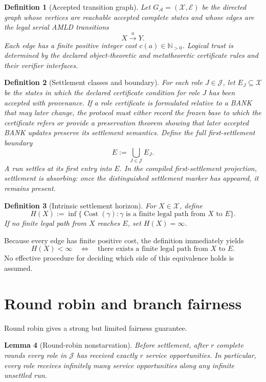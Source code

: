 \documentclass[11pt]{article}
\newtheorem{definition}{Definition}[section]
\newtheorem{lemma}[definition]{Lemma}
\theoremstyle{remark}
\newcommand{\N}{\mathbb N}
\newcommand{\Cost}{\operatorname{Cost}}
\begin{document}
\begin{definition}[Accepted transition graph]
Let $G_{\mathcal A}=(\mathcal X,\mathcal E)$ be the directed graph whose vertices are reachable accepted complete states and whose edges are the legal serial AMLD transitions
\[
X\xrightarrow{a}Y.
\]
Each edge has a finite positive integer cost $c(a)\in\N_{>0}$.  Logical trust is determined by the declared object-theoretic and metatheoretic certificate rules and their verifier interfaces.
\end{definition}

\begin{definition}[Settlement classes and boundary]
For each role $J\in\mathcal J$, let $E_J\subseteq\mathcal X$ be the states in which the declared certificate condition for role $J$ has been accepted with provenance.  If a role certificate is formulated relative to a BANK that may later change, the protocol must either record the frozen base to which the certificate refers or provide a preservation theorem showing that later accepted BANK updates preserve its settlement semantics.  Define the full first-settlement boundary
\[
E:=\bigcup_{J\in\mathcal J}E_J.
\]
A run settles at its first entry into $E$.  In the compiled first-settlement projection, settlement is absorbing: once the distinguished settlement marker has appeared, it remains present.
\end{definition}

\begin{definition}[Intrinsic settlement horizon]
For $X\in\mathcal X$, define
\[
H(X):=\inf\{\Cost(\gamma):\gamma\text{ is a finite legal path from }X\text{ to }E\}.
\]
If no finite legal path from $X$ reaches $E$, set $H(X)=\infty$.
\end{definition}

Because every edge has finite positive cost, the definition immediately yields
\[
H(X)<\infty
\quad\Longleftrightarrow\quad
\text{there exists a finite legal path from $X$ to $E$}.
\]
No effective procedure for deciding which side of this equivalence holds is assumed.

\section{Round robin and branch fairness}

Round robin gives a strong but limited fairness guarantee.

\begin{lemma}[Round-robin nonstarvation]
Before settlement, after $r$ complete rounds every role in $\mathcal J$ has received exactly $r$ service opportunities.  In particular, every role receives infinitely many service opportunities along any infinite unsettled run.
\end{lemma}
\end{document}
